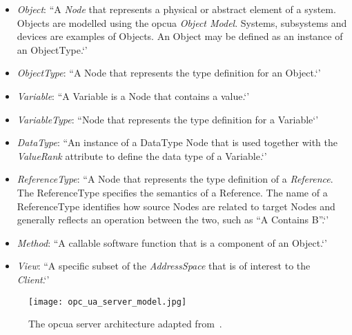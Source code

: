 \documentclass[
a4paper,
twoside,
headsepline,
cleardoublepage=empty,
parskip=half,
draft=false
]{scrbook}
\begin{document}
				\begin{itemize}
					
					\item \textit{Object}: ``A \textit{Node} that represents a physical or abstract element of a system. Objects are modelled using the \gls{opcua} \textit{Object Model}. Systems, subsystems and devices are examples of Objects. An Object may be defined as an instance of an ObjectType.`'~\cite{opcfoundation2017part1}
					
					\item \textit{ObjectType}: ``A Node that represents the type definition
					for an Object.`'~\cite{opcfoundation2017part1}
					
					\item \textit{Variable}: ``A Variable is a Node that contains a value.`'~\cite{opcfoundation2017part1}
					
					\item \textit{VariableType}: ``Node that represents the type definition for a Variable`'~\cite{opcfoundation2018part3}
					
					\item \textit{DataType}: ``An instance of a DataType Node that is used together with the \textit{ValueRank} attribute to define the data type of a Variable.`'~\cite{opcfoundation2018part3}
					
					\item \textit{ReferenceType}: ``A Node that represents the type definition of a \textit{Reference}. The ReferenceType specifies the semantics of a Reference. The name of a ReferenceType identifies how source Nodes are related to target Nodes and generally reflects an operation between the two, such as “A Contains B”.`'~\cite{opcfoundation2017part1}
					
					\item \textit{Method}: ``A callable software function that is a component of an Object.`'~\cite{opcfoundation2017part1}
					
					\item \textit{View}: ``A specific subset of the \textit{AddressSpace} that is of interest to the \textit{Client}.`'~\cite{opcfoundation2017part1}
					
				\end{itemize}
			
				\begin{figure}[htbp]
					\centering
					\texttt{[image: opc\_ua\_server\_model.jpg]}
					\caption{The \gls{opcua} server architecture adapted from~\cite{opcfoundation2017part1}.}
					\label{fig:opc_ua_server_model}
				\end{figure}
		
\end{document}
